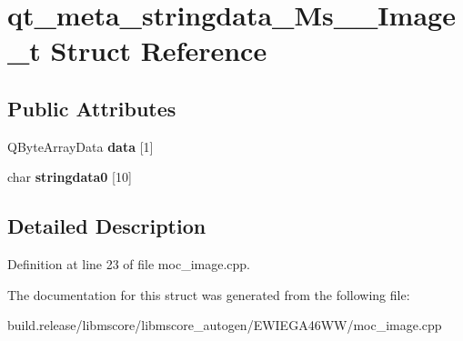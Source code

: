 \hypertarget{structqt__meta__stringdata___ms_____image__t}{}\section{qt\+\_\+meta\+\_\+stringdata\+\_\+\+Ms\+\_\+\+\_\+\+Image\+\_\+t Struct Reference}
\label{structqt__meta__stringdata___ms_____image__t}
\subsection*{Public Attributes}
\begin{DoxyCompactItemize}
\item 
\mbox{\label{structqt__meta__stringdata___ms_____image__t_a32bafcc26a383974ec2fa51d40b6e7a7}} 
Q\+Byte\+Array\+Data {\bfseries data} \mbox{[}1\mbox{]}
\item 
\mbox{\label{structqt__meta__stringdata___ms_____image__t_ab6af47444f620b7db8524223cc767aaa}} 
char {\bfseries stringdata0} \mbox{[}10\mbox{]}
\end{DoxyCompactItemize}


\subsection{Detailed Description}


Definition at line 23 of file moc\+\_\+image.\+cpp.



The documentation for this struct was generated from the following file\+:\begin{DoxyCompactItemize}
\item 
build.\+release/libmscore/libmscore\+\_\+autogen/\+E\+W\+I\+E\+G\+A46\+W\+W/moc\+\_\+image.\+cpp\end{DoxyCompactItemize}
